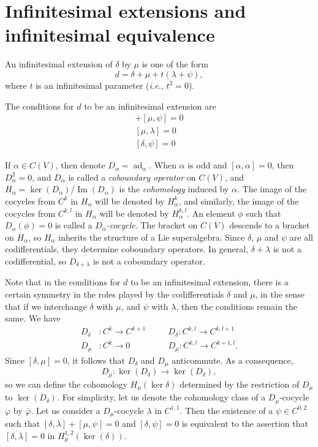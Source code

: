 \documentclass[12pt]{amsart}
\theoremstyle{definition}
\begin{document}
\section{Infinitesimal extensions and infinitesimal
equivalence}\label{sec4}
 An infinitesimal extension of $\delta$ by
$\mu$ is one of the form
\begin{equation*}
d=\delta+\mu+t(\lambda+\psi),
\end{equation*}
where $t$ is an infinitesimal parameter ({\hbox{\it i.e.}}, $t^2=0$).

The conditions for $d$ to be an infinitesimal extension are
\begin{align}
[\delta,\lambda]+[\mu,\psi]=0\label{infr1}\\
[\mu,\lambda]=0\label{infr2}\\
[\delta,\psi]=0\label{infr3}
\end{align}

If $\alpha\in C(V)$, then denote $D_\alpha={\operatorname{ad}}_\alpha$. When
$\alpha$ is odd and $[\alpha,\alpha]=0$, then $D^2_\alpha=0$, and
$D_\alpha$ is called a \emph{coboundary operator} on $C(V)$, and
$H_\alpha=\ker(D_\alpha)/{\operatorname{Im}}(D_\alpha)$ is the \emph{cohomology}
induced by $\alpha$. The image of the cocycles from $C^{k}$ in
$H_\alpha$ will be denoted by $H^k_\alpha$, and similarly, the image
of the cocycles from $C^{k,l}$ in $H_\alpha$ will be denoted by
$H^{k,l}_\alpha$. An element $\phi$ such that $D_\alpha(\phi)=0$ is
called a \emph{$D_\alpha$-cocycle}. The bracket on $C(V)$ descends
to a bracket on $H_\alpha$, so $H_\alpha$ inherits the structure of
a Lie superalgebra. Since $\delta$, $\mu$ and $\psi$ are all
codifferentials, they determine coboundary operators. In general,
$\delta+\lambda$ is not a codifferential, so $D_{\delta+\lambda}$ is
not a coboundary operator.

Note that in the conditions for $d$
to be an infinitesimal extension, there is a certain symmetry in the
roles played by the codifferentials $\delta$ and $\mu$,
in the sense that if we interchange $\delta$ with $\mu$, and
$\psi$ with $\lambda$, then the conditions remain the same.  We have
\begin{align*}
D_\delta&:C^k{\rightarrow} C^{k+1}&\quad&D_\delta:C^{k,l}{\rightarrow} C^{k,l+1}\\
D_\mu&:C^k{\rightarrow} 0&\quad& D_\mu:C^{k,l}{\rightarrow} C^{k+1,l}.
\end{align*}
Since $[\delta,\mu]=0$, it follows that $D_\delta$ and $D_\mu$ anticommute. As a consequence,
\begin{equation*}
D_\mu:\ker(D_\delta){\rightarrow} \ker(D_\delta),
\end{equation*}
so we can define the cohomology $H_\mu(\ker\delta)$ determined by the restriction of $D_\mu$ to
$\ker(D_\delta)$. For simplicity, let us denote the cohomology class  of a
$D_\mu$-cocycle ${\varphi}$ by $\bar{\varphi}$. Let us consider a $D_\mu$-cocycle $\lambda$ in $C^{1,1}$. Then
the
existence of a $\psi\in C^{0,2}$ such that $[\delta,\lambda]+[\mu,\psi]=0$ and
$[\delta,\psi]=0$ is equivalent to the assertion that
$\overline{[\delta,\lambda]}=0$ in $H_\mu^{1,2}(\ker(\delta))$.
\end{document}
